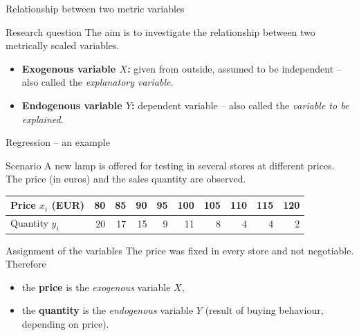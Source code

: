 \documentclass[aspectratio=169,11pt]{beamer}
\begin{document}
\begin{frame}{Relationship between two metric variables}
  \begin{block}{Research question}
    The aim is to investigate the relationship between two
    metrically scaled variables.
  \end{block}

  \medskip

  \begin{itemize}
    \item \textbf{Exogenous variable $X$:} given from outside, assumed
          to be independent -- also called the \emph{explanatory variable}.
    \item \textbf{Endogenous variable $Y$:} dependent variable -- also
          called the \emph{variable to be explained}.
  \end{itemize}
\end{frame}

\begin{frame}{Regression -- an example}
  \begin{block}{Scenario}
    A new lamp is offered for testing in several stores at different
    prices. The price (in euros) and the sales quantity are observed.
  \end{block}

  \medskip

  \begin{center}
    \begin{tabular}{l*{9}{r}}
      \toprule
      Price $x_i$ (EUR) & 80 & 85 & 90 & 95 & 100 & 105 & 110 & 115 & 120 \\
      \midrule
      Quantity $y_i$     & 20 & 17 & 15 & 9  & 11  & 8   & 4   & 4   & 2   \\
      \bottomrule
    \end{tabular}
  \end{center}

  \medskip

  \begin{exampleblock}{Assignment of the variables}
    The price was fixed in every store and not negotiable. Therefore
    \begin{itemize}
      \item the \textbf{price} is the \emph{exogenous} variable $X$,
      \item the \textbf{quantity} is the \emph{endogenous} variable $Y$
            (result of buying behaviour, depending on price).
    \end{itemize}
  \end{exampleblock}
\end{frame}
\end{document}
